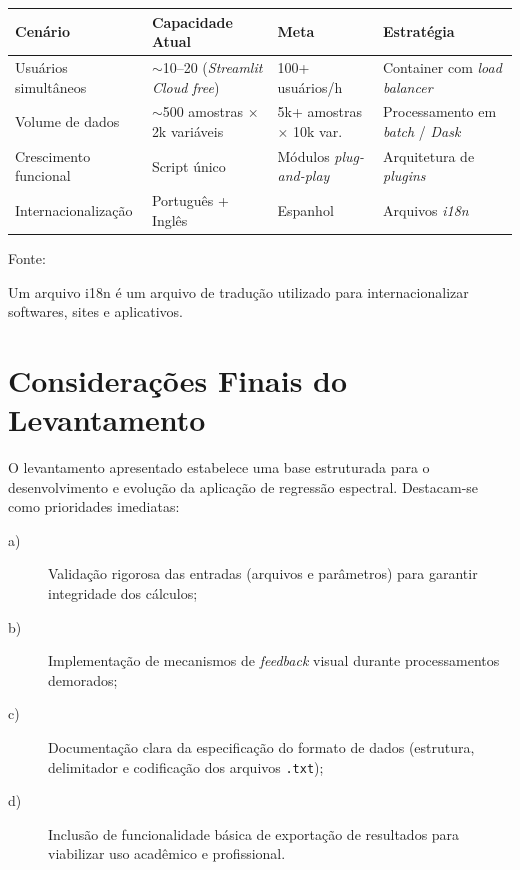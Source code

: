 \begin{quadro}[ht]
\begin{center}
\small
\captionsetup{justification=centering, labelsep=endash, width=0.75\linewidth}
\caption{Requisitos de escalabilidade do sistema.}
\label{tab:escalabilidade}
\begin{threeparttable}
\begin{tabularx}{\textwidth}{|l|X|X|X|} \hline
\textbf{Cenário} & \textbf{Capacidade Atual} & \textbf{Meta} & \textbf{Estratégia} \\ \hline
Usuários simultâneos & $\sim$10--20 (\textit{Streamlit Cloud free}) & 100+ usuários/h & Container com \textit{load balancer} \\ \hline
Volume de dados & $\sim$500 amostras $\times$ 2k variáveis & 5k+ amostras $\times$ 10k var. & Processamento em \textit{batch} / \textit{Dask} \\ \hline
Crescimento funcional & Script único & Módulos \textit{plug-and-play} & Arquitetura de \textit{plugins} \\ \hline
Internacionalização & Português + Inglês & Espanhol & Arquivos \textit{i18n}\tnote{a} \\ \hline
\end{tabularx}
\begin{tablenotes}[flushleft]
\footnotesize
\item Fonte:~\oautor
\item[a] Um arquivo i18n\cite{w3c_i18n_activity} é um arquivo de tradução utilizado para internacionalizar softwares, sites e aplicativos.
\end{tablenotes}
\end{threeparttable}
\end{center}
\end{quadro}


\section{Considerações Finais do Levantamento}
\label{sec:consideracoes-levantamento}

O levantamento apresentado estabelece uma base estruturada para o desenvolvimento e evolução da aplicação de regressão espectral. Destacam-se como prioridades imediatas:

\begin{description}
	\item[a)] Validação rigorosa das entradas (arquivos e parâmetros) para garantir integridade dos cálculos;
	\item[b)] Implementação de mecanismos de \textit{feedback} visual durante processamentos demorados;
	\item[c)] Documentação clara da especificação do formato de dados (estrutura, delimitador e codificação dos arquivos \texttt{.txt});
	\item[d)] Inclusão de funcionalidade básica de exportação de resultados para viabilizar uso acadêmico e profissional.
\end{description}

